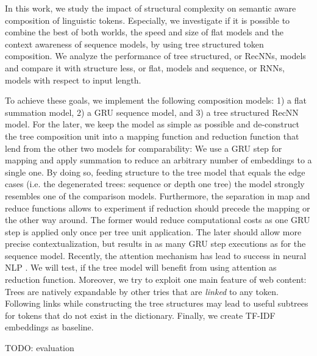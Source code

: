 In this work, we study the impact of structural complexity on semantic aware composition of linguistic tokens. Especially, we investigate if it is possible to combine the best of both worlds, the speed and size of flat models and the context awareness of sequence models, by using tree structured token composition. We analyze the performance of tree structured, or \acp{RecNN}, models and compare it with structure less, or flat, models and sequence, or \acp{RNN}, models with respect to input length.

To achieve these goals, we implement the following composition models: 1) a flat summation model, 2) a \ac{GRU} sequence model, and 3) a tree structured \ac{RecNN} model. For the later, we keep the model as simple as possible and de-construct the tree composition unit into a mapping function and reduction function that lend from the other two models for comparability: We use a \ac{GRU} step for mapping and apply summation to reduce an arbitrary number of embeddings to a single one. By doing so, feeding structure to the tree model that equals the edge cases (i.e. the degenerated trees: sequence or depth one tree) the model strongly resembles one of the comparison models. Furthermore, the separation in map and reduce functions allows to experiment if reduction should precede the mapping or the other way around. The former would reduce computational costs as one \ac{GRU} step is applied only once per tree unit application. The later should allow more precise contextualization, but results in as many \ac{GRU} step executions as for the sequence model. Recently, the attention mechanism has lead to success in neural \ac{NLP} . We will test, if the tree model will benefit from using attention as reduction function. Moreover, we try to exploit one main feature of web content: Trees are natively expandable by other tries that are \textit{linked} to any token. Following links while constructing the tree structures may lead to useful subtrees for tokens that do not exist in the dictionary. Finally, we create \ac{TF-IDF} embeddings as baseline.   

TODO: evaluation






